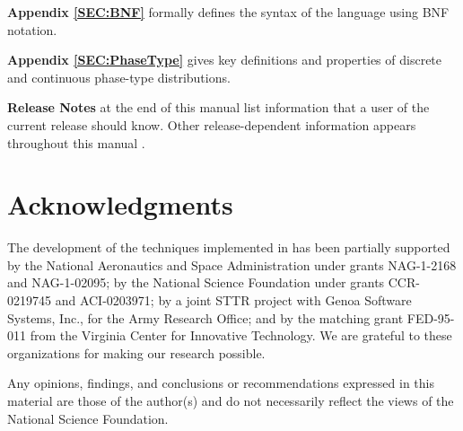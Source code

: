 \begin{description}
\item{\bf Appendix \ref{SEC:BNF}}
formally defines the syntax of the {\smart} language using BNF notation.

\item{\bf Appendix \ref{SEC:PhaseType}}
gives key definitions and properties of
discrete and continuous phase-type distributions.

\item{\bf Release Notes}
at the end of this manual list information that a user of the current
release should know.
Other release-dependent information appears throughout this manual
.

\end{description}

\vfill

\section*{\centering Acknowledgments}

The development of the techniques implemented in {\smart} has been partially
supported by the
National Aeronautics and Space Administration under grants
NAG-1-2168 and NAG-1-02095;
by the National Science Foundation under grants CCR-0219745 and ACI-0203971;
by a joint STTR project with Genoa Software Systems,
Inc., for the Army Research Office;
and by the matching grant FED-95-011 from the Virginia Center for
Innovative Technology.
We are grateful to these organizations for making our research possible.

Any opinions, findings, and conclusions or recommendations expressed in this
material are those of the author(s) and do not necessarily reflect the views
of the National Science Foundation.
